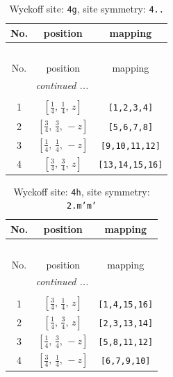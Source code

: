 \documentclass[fleqn,8pt]{jsarticle}
\begin{document}
\renewcommand{\arraystretch}{1.2}
\begin{longtable}{ccc}
\caption{Wyckoff site: {\tt 4g}, site symmetry: {\tt 4..}}
 \\
 \hline \hline
No. & position & mapping \\ \hline \endfirsthead

\multicolumn{2}{l}{\tablename\ \thetable{}} \\
 \hline \hline
No. & position & mapping \\ \hline \endhead

 \hline \hline
\multicolumn{2}{r}{\footnotesize\it continued ...} \\ \endfoot

 \hline \hline
\multicolumn{2}{r}{} \\ \endlastfoot

1 & $\left[ \frac{1}{4},\, \frac{1}{4},\, z \right]$ & {\tt [1,2,3,4]} \\ \hline
2 & $\left[ \frac{3}{4},\, \frac{3}{4},\, - z \right]$ & {\tt [5,6,7,8]} \\ \hline
3 & $\left[ \frac{1}{4},\, \frac{1}{4},\, - z \right]$ & {\tt [9,10,11,12]} \\ \hline
4 & $\left[ \frac{3}{4},\, \frac{3}{4},\, z \right]$ & {\tt [13,14,15,16]} \\
\end{longtable}
\renewcommand{\arraystretch}{1.2}
\begin{longtable}{ccc}
\caption{Wyckoff site: {\tt 4h}, site symmetry: {\tt 2.m'm'}}
 \\
 \hline \hline
No. & position & mapping \\ \hline \endfirsthead

\multicolumn{2}{l}{\tablename\ \thetable{}} \\
 \hline \hline
No. & position & mapping \\ \hline \endhead

 \hline \hline
\multicolumn{2}{r}{\footnotesize\it continued ...} \\ \endfoot

 \hline \hline
\multicolumn{2}{r}{} \\ \endlastfoot

1 & $\left[ \frac{3}{4},\, \frac{1}{4},\, z \right]$ & {\tt [1,4,15,16]} \\ \hline
2 & $\left[ \frac{1}{4},\, \frac{3}{4},\, z \right]$ & {\tt [2,3,13,14]} \\ \hline
3 & $\left[ \frac{1}{4},\, \frac{3}{4},\, - z \right]$ & {\tt [5,8,11,12]} \\ \hline
4 & $\left[ \frac{3}{4},\, \frac{1}{4},\, - z \right]$ & {\tt [6,7,9,10]} \\
\end{longtable}
\end{document}
